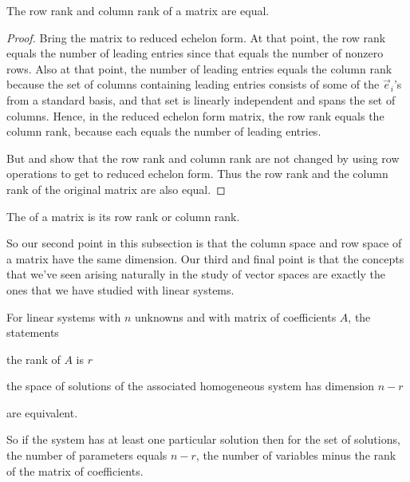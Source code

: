 \begin{theorem}
The row rank and column rank of a matrix are equal.
\end{theorem}

\begin{proof}
Bring the matrix to reduced echelon form.
At that point, the 
row rank equals the number of leading entries since that equals the
number of nonzero rows.
Also at that point, the number of leading entries
equals the column rank because the set of columns containing leading
entries consists of some of the \( \vec{e}_i \)'s from a standard
basis, and that set is linearly independent and spans the set of
columns.
Hence, in the reduced echelon form matrix, the row rank equals the column
rank, because each equals the number of leading entries.

But  and  
show that the row rank and column rank are not changed
by using row operations to get to reduced echelon form.
Thus the row rank and the column rank of the original matrix are also equal.
\end{proof}

\begin{definition}
The  of a matrix is its row rank or column rank.
\end{definition}

So our second point in this subsection is that the column space and row
space of a matrix have the same dimension.
Our third and final point is that the concepts that
we've seen arising naturally in the study of
vector spaces are exactly the ones that we have studied with linear systems.

\begin{theorem}
\label{th:RankVsSoltnSp}
For linear systems with \( n \) unknowns and with matrix of coefficients
\( A \), the statements
\begin{tfae}
   \item the rank of \( A \) is \( r \)
   \item the space of solutions of the associated homogeneous system has
     dimension \( n-r \)
\end{tfae}
are equivalent.
\end{theorem}

\par\noindent So if the system has at least one particular solution 
then for the set of
solutions, the number of parameters equals $n-r$, the number of variables
minus the rank of the matrix of coefficients. 


